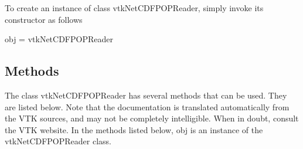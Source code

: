 To create an instance of class vtk\-Net\-C\-D\-F\-P\-O\-P\-Reader, simply invoke its constructor as follows \begin{DoxyVerb}  obj = vtkNetCDFPOPReader
\end{DoxyVerb}
 \hypertarget{vtkwidgets_vtkxyplotwidget_Methods}{}\subsection{Methods}\label{vtkwidgets_vtkxyplotwidget_Methods}
The class vtk\-Net\-C\-D\-F\-P\-O\-P\-Reader has several methods that can be used. They are listed below. Note that the documentation is translated automatically from the V\-T\-K sources, and may not be completely intelligible. When in doubt, consult the V\-T\-K website. In the methods listed below, {\ttfamily obj} is an instance of the vtk\-Net\-C\-D\-F\-P\-O\-P\-Reader class. 
